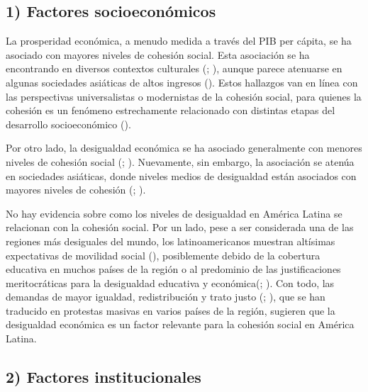 \documentclass[
  letterpaper,
  DIV=11,
  numbers=noendperiod]{scrartcl}
\begin{document}
\subsection{1) Factores
socioeconómicos}\label{factores-socioeconuxf3micos}

La prosperidad económica, a menudo medida a través del PIB per cápita,
se ha asociado con mayores niveles de cohesión social. Esta asociación
se ha encontrando en diversos contextos culturales
(;
),
aunque parece atenuarse en algunas sociedades asiáticas de altos
ingresos (). Estos
hallazgos van en línea con las perspectivas universalistas o modernistas
de la cohesión social, para quienes la cohesión es un fenómeno
estrechamente relacionado con distintas etapas del desarrollo
socioeconómico ().

Por otro lado, la desigualdad económica se ha asociado generalmente con
menores niveles de cohesión social
(;
). Nuevamente, sin
embargo, la asociación se atenúa en sociedades asiáticas, donde niveles
medios de desigualdad están asociados con mayores niveles de cohesión
(;
).

No hay evidencia sobre como los niveles de desigualdad en América Latina
se relacionan con la cohesión social. Por un lado, pese a ser
considerada una de las regiones más desiguales del mundo, los
latinoamericanos muestran altísimas expectativas de movilidad social
(),
posiblemente debido de la cobertura educativa en muchos países de la
región o al predominio de las justificaciones meritocráticas para la
desigualdad educativa y
económica(;
). Con todo, las demandas de mayor igualdad, redistribución y trato
justo (;
), que se han
traducido en protestas masivas en varios países de la región, sugieren
que la desigualdad económica es un factor relevante para la cohesión
social en América Latina.

\subsection{2) Factores institucionales}\label{factores-institucionales}
\end{document}
